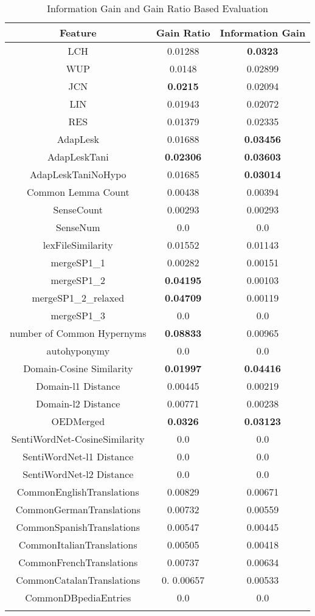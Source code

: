 \begin{center}
\begin{longtable}{| c | c | c |}      
\hline
\textbf{Feature} & \textbf{Gain Ratio} & \textbf{Information Gain} \\ \hline
LCH & 0.01288 & \textbf{0.0323} \\ \hline
WUP & 0.0148 & 0.02899 \\ \hline
JCN & \textbf{0.0215} & 0.02094 \\ \hline
LIN & 0.01943 & 0.02072 \\ \hline
RES & 0.01379 & 0.02335 \\ \hline
AdapLesk & 0.01688 & \textbf{0.03456} \\ \hline
AdapLeskTani & \textbf{0.02306} & \textbf{0.03603} \\ \hline
AdapLeskTaniNoHypo & 0.01685 & \textbf{0.03014} \\ \hline
\hline
Common Lemma Count & 0.00438 & 0.00394 \\ \hline
SenseCount & 0.00293 & 0.00293 \\ \hline
SenseNum & 0.0 & 0.0 \\ \hline
lexFileSimilarity & 0.01552 & 0.01143 \\ \hline
mergeSP1\_1 & 0.00282 & 0.00151 \\ \hline
mergeSP1\_2 & \textbf{0.04195} & 0.00103 \\ \hline
mergeSP1\_2\_relaxed & \textbf{0.04709} & 0.00119 \\ \hline
mergeSP1\_3 & 0.0 & 0.0 \\ \hline
number of Common Hypernyms & \textbf{0.08833} & 0.00965 \\ \hline
autohyponymy & 0.0 & 0.0 \\ \hline
\hline
Domain-Cosine Similarity & \textbf{0.01997} & \textbf{0.04416} \\ \hline
Domain-l1 Distance & 0.00445 & 0.00219 \\ \hline
Domain-l2 Distance & 0.00771 & 0.00238 \\ \hline
OEDMerged & \textbf{0.0326} & \textbf{0.03123} \\ \hline
SentiWordNet-CosineSimilarity & 0.0 & 0.0 \\ \hline
SentiWordNet-l1 Distance & 0.0 & 0.0 \\ \hline
SentiWordNet-l2 Distance & 0.0 & 0.0  \\ \hline
CommonEnglishTranslations & 0.00829 & 0.00671 \\ \hline
CommonGermanTranslations & 0.00732 & 0.00559 \\ \hline
CommonSpanishTranslations & 0.00547 & 0.00445 \\ \hline
CommonItalianTranslations & 0.00505 & 0.00418 \\ \hline
CommonFrenchTranslations & 0.00737 & 0.00634 \\ \hline
CommonCatalanTranslations & 0. 0.00657 & 0.00533 \\ \hline
CommonDBpediaEntries & 0.0 & 0.0 \\ \hline
\caption{Information Gain and Gain Ratio Based Evaluation}
\label{tab:FeatureWiseEvaluation}
\end{longtable}
\end{center}

